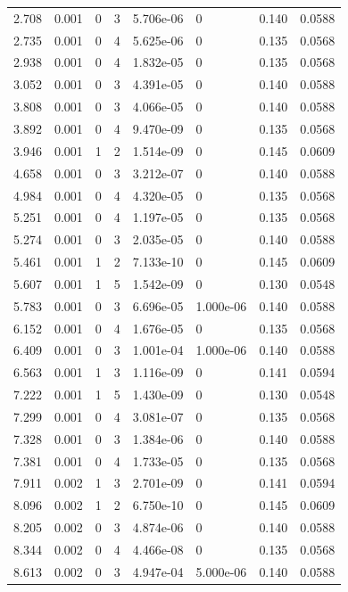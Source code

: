 \documentclass[preview]{standalone}
\begin{document}
{{\begin{tabular}{L{1.2cm}C{1.2cm} C{0.3cm}C{0.5cm} C{1.4cm}C{1.4cm} C{1.4cm}C{1.4cm}}
  2.708  &  0.001  & 0     &  3 &  5.706e-06  & 0  & 0.140 &  0.0588   \\ 
  2.735  &  0.001  & 0     &  4 &  5.625e-06  & 0  & 0.135 &  0.0568   \\ 
  2.938  &  0.001  & 0     &  4 &  1.832e-05  & 0  & 0.135 &  0.0568   \\ 
  3.052  &  0.001  & 0     &  3 &  4.391e-05  & 0  & 0.140 &  0.0588   \\ 
  3.808  &  0.001  & 0     &  3 &  4.066e-05  & 0  & 0.140 &  0.0588   \\ 
  3.892  &  0.001  & 0     &  4 &  9.470e-09  & 0  & 0.135 &  0.0568   \\ 
  3.946  &  0.001  & 1     &  2 &  1.514e-09  & 0  & 0.145 &  0.0609   \\ 
  4.658  &  0.001  & 0     &  3 &  3.212e-07  & 0  & 0.140 &  0.0588   \\ 
  4.984  &  0.001  & 0     &  4 &  4.320e-05  & 0  & 0.135 &  0.0568   \\ 
  5.251  &  0.001  & 0     &  4 &  1.197e-05  & 0  & 0.135 &  0.0568   \\ 
  5.274  &  0.001  & 0     &  3 &  2.035e-05  & 0  & 0.140 &  0.0588   \\ 
  5.461  &  0.001  & 1     &  2 &  7.133e-10  & 0  & 0.145 &  0.0609   \\ 
  5.607  &  0.001  & 1     &  5 &  1.542e-09  & 0  & 0.130 &  0.0548   \\ 
  5.783  &  0.001  & 0     &  3 &  6.696e-05  & 1.000e-06  & 0.140 &  0.0588   \\ 
  6.152  &  0.001  & 0     &  4 &  1.676e-05  & 0  & 0.135 &  0.0568   \\ 
  6.409  &  0.001  & 0     &  3 &  1.001e-04  & 1.000e-06  & 0.140 &  0.0588   \\ 
  6.563  &  0.001  & 1     &  3 &  1.116e-09  & 0  & 0.141 &  0.0594   \\ 
  7.222  &  0.001  & 1     &  5 &  1.430e-09  & 0  & 0.130 &  0.0548   \\ 
  7.299  &  0.001  & 0     &  4 &  3.081e-07  & 0  & 0.135 &  0.0568   \\ 
  7.328  &  0.001  & 0     &  3 &  1.384e-06  & 0  & 0.140 &  0.0588   \\ 
  7.381  &  0.001  & 0     &  4 &  1.733e-05  & 0  & 0.135 &  0.0568   \\ 
  7.911  &  0.002  & 1     &  3 &  2.701e-09  & 0  & 0.141 &  0.0594   \\ 
  8.096  &  0.002  & 1     &  2 &  6.750e-10  & 0  & 0.145 &  0.0609   \\ 
  8.205  &  0.002  & 0     &  3 &  4.874e-06  & 0  & 0.140 &  0.0588   \\ 
  8.344  &  0.002  & 0     &  4 &  4.466e-08  & 0  & 0.135 &  0.0568   \\ 
  8.613  &  0.002  & 0     &  3 &  4.947e-04  & 5.000e-06  & 0.140 &  0.0588   \\ 
\hline 
\end{tabular} 

}}
\end{document}
